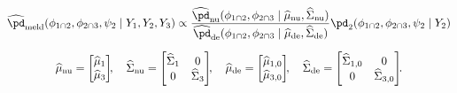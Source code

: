 \begin{equation}
\begin{gathered}
  \widehat{\pd}_{\text{meld}} (\phi_{1 \cap 2}, \phi_{2 \cap 3}, \psi_{2} \mid Y_{1}, Y_{2}, Y_{3})
  \propto
  \frac {
    \widehat{\pd}_{\text{nu}}(\phi_{1 \cap 2}, \phi_{2 \cap 3} \mid \widehat{\mu}_{\text{nu}}, \widehat{\Sigma}_{\text{nu}})
  } {
    \widehat{\pd}_{\text{de}}(\phi_{1 \cap 2}, \phi_{2 \cap 3} \mid \widehat{\mu}_{\text{de}}, \widehat{\Sigma}_{\text{de}})
  }
  \pd_{2}(\phi_{1 \cap 2}, \phi_{2 \cap 3}, \psi_{2} \mid Y_{2}) \\[1.5ex]
  \widehat{\mu}_{\text{nu}} = \begin{bmatrix}
    \widehat{\mu}_{1} \\
    \widehat{\mu}_{3}
  \end{bmatrix}\!\!, \quad
  \widehat{\Sigma}_{\text{nu}} = \begin{bmatrix}
    \widehat{\Sigma}_{1} & 0 \\
    0 & \widehat{\Sigma}_{3}
  \end{bmatrix}\!\!, \quad
  \widehat{\mu}_{\text{de}} = \begin{bmatrix}
    \widehat{\mu}_{1, 0} \\
    \widehat{\mu}_{3, 0}
  \end{bmatrix}\!\!, \quad
  \widehat{\Sigma}_{\text{de}} = \begin{bmatrix}
    \widehat{\Sigma}_{1, 0} & 0 \\
    0 & \widehat{\Sigma}_{3, 0}
  \end{bmatrix}\!\!.
\end{gathered}
\label{eqn:normal-approx-nu-de-form}
\end{equation}
  